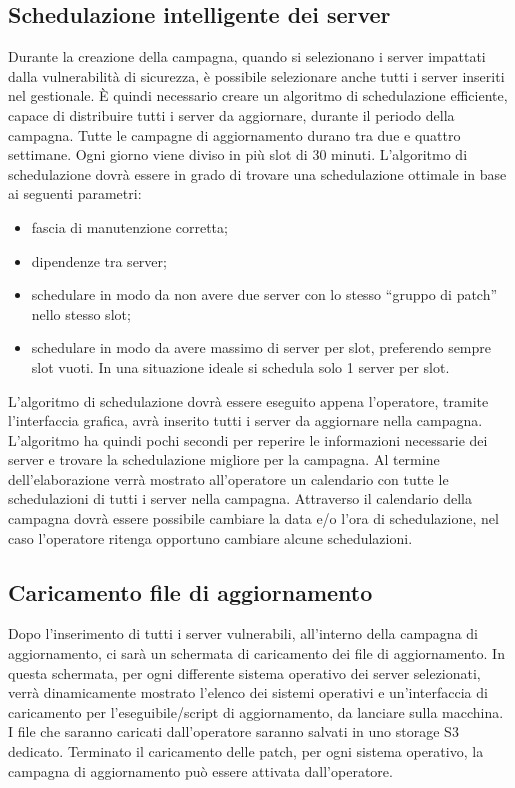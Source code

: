 \subsection{Schedulazione intelligente dei server}
Durante la creazione della campagna, quando si selezionano i server impattati 
dalla vulnerabilità di sicurezza, è possibile selezionare anche tutti i server
inseriti nel gestionale. 
È quindi necessario creare un algoritmo di schedulazione efficiente, capace di 
distribuire tutti i server da aggiornare, durante il periodo della campagna.
Tutte le campagne di aggiornamento durano tra due e quattro settimane. 
Ogni giorno viene diviso in più slot di 30 minuti. L’algoritmo di schedulazione 
dovrà essere in grado di trovare una schedulazione ottimale in base ai 
seguenti parametri:
\begin{itemize}
\item fascia di manutenzione corretta;
\item dipendenze tra server;
\item schedulare in modo da non avere due server con lo stesso 
“gruppo di patch” nello stesso slot;
\item schedulare in modo da avere massimo di server per slot, preferendo 
sempre slot vuoti. In una situazione ideale si schedula solo 1 server per slot.
\end{itemize}
L’algoritmo di schedulazione dovrà essere eseguito appena l’operatore, tramite 
l’interfaccia grafica, avrà inserito tutti i server da aggiornare nella 
campagna. L’algoritmo ha quindi pochi secondi per reperire le informazioni 
necessarie dei server e trovare la schedulazione migliore per la campagna.
Al termine dell’elaborazione verrà mostrato all’operatore un calendario con
tutte le schedulazioni di tutti i server nella campagna.
Attraverso il calendario della campagna dovrà essere possibile cambiare la 
data e/o l’ora di schedulazione, nel caso l’operatore ritenga opportuno
cambiare alcune schedulazioni.


\subsection{Caricamento file di aggiornamento}
Dopo l’inserimento di tutti i server vulnerabili, all'interno della campagna 
di aggiornamento, ci sarà un schermata di caricamento dei file di aggiornamento.
In questa schermata, per ogni differente sistema operativo dei server
selezionati, verrà dinamicamente mostrato l’elenco dei sistemi operativi
e un’interfaccia di caricamento per l’eseguibile/script di aggiornamento, 
da lanciare sulla macchina.
I file che saranno caricati dall’operatore saranno salvati in uno storage 
S3 dedicato.
Terminato il caricamento delle patch, per ogni sistema operativo, la campagna 
di aggiornamento può essere attivata dall’operatore.


